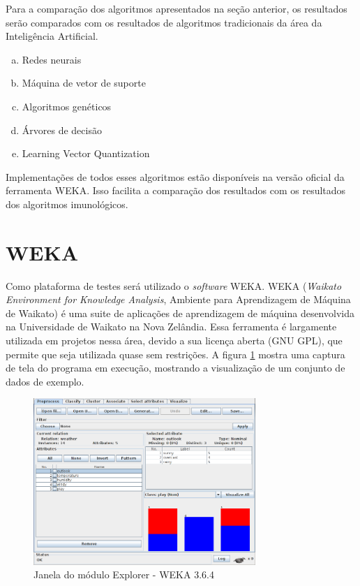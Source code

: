 Para a comparação dos algoritmos apresentados na seção anterior, os resultados serão comparados com os resultados de algoritmos tradicionais da área da Inteligência Artificial.

\begin{enumerate}[a)]
    \item Redes neurais
    \item Máquina de vetor de suporte
    \item Algoritmos genéticos
    \item Árvores de decisão
    \item Learning Vector Quantization
\end{enumerate}

Implementações de todos esses algoritmos estão disponíveis na versão oficial da ferramenta WEKA. Isso facilita a comparação dos resultados com os resultados dos algoritmos imunológicos.

\section{WEKA}
\label{sec:prop_weka}

Como plataforma de testes será utilizado o \emph{software} WEKA. WEKA (\emph{Waikato Environment for Knowledge Analysis}, Ambiente para Aprendizagem de Máquina de Waikato) é uma suite de aplicações de aprendizagem de máquina desenvolvida na Universidade de Waikato na Nova Zelândia. Essa ferramenta é largamente utilizada em projetos nessa área, devido a sua licença aberta (GNU GPL), que permite que seja utilizada quase sem restrições. A figura \ref{fig:prop_weka} mostra uma captura de tela do programa em execução, mostrando a visualização de um conjunto de dados de exemplo.

\begin{figure}[h!]
    \centering
    \caption{Janela do módulo Explorer - WEKA 3.6.4}
    \label{fig:prop_weka}
    \includegraphics[width=0.75\textwidth]{img/weka.png}
\end{figure}

